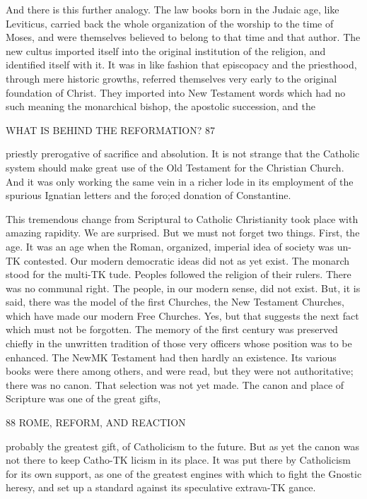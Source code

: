 \documentclass[12pt,a5paper,oneside]{book}
\begin{document}
And there is this further analogy. The law books 
born in the Judaic age, like Leviticus, carried back 
the whole organization of the worship to the time of 
Moses, and were themselves believed to belong to that 
time and that author. The new cultus imported 
itself into the original institution of the religion, and 
identified itself with it. It was in like fashion that 
episcopacy and the priesthood, through mere historic 
growths, referred themselves very early to the original 
foundation of Christ. They imported into New 
Testament words which had no such meaning the 
monarchical bishop, the apostolic succession, and the 



WHAT IS BEHIND THE REFORMATION? 87 

priestly prerogative of sacrifice and absolution. It is 
not strange that the Catholic system should make great 
use of the Old Testament for the Christian Church. 
And it was only working the same vein in a richer 
lode in its employment of the spurious Ignatian letters 
and the foro;ed donation of Constantine. 

This tremendous change from Scriptural to 
Catholic Christianity took place with amazing rapidity. 
We are surprised. But we must not forget two 
things. First, the age. It was an age when the 
Roman, organized, imperial idea of society was un-TK
contested. Our modern democratic ideas did not 
as yet exist. The monarch stood for the multi-TK
tude. Peoples followed the religion of their rulers. 
There was no communal right. The people, in our 
modern sense, did not exist. But, it is said, there was 
the model of the first Churches, the New Testament 
Churches, which have made our modern Free Churches. 
Yes, but that suggests the next fact which must not 
be forgotten. The memory of the first century was 
preserved chiefly in the unwritten tradition of those 
very officers whose position was to be enhanced. 
The NewMK Testament had then hardly an existence. 
Its various books were there among others, and were 
read, but they were not authoritative; there was 
no canon. That selection was not yet made. The 
canon and place of Scripture was one of the great gifts, 



88 ROME, REFORM, AND REACTION 

probably the greatest gift, of Catholicism to the future. 
But as yet the canon was not there to keep Catho-TK
licism in its place. It was put there by Catholicism 
for its own support, as one of the greatest 
engines with which to fight the Gnostic heresy, and 
set up a standard against its speculative extrava-TK
gance. 
\end{document}
